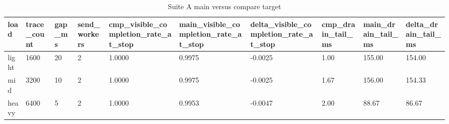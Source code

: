 \begin{table}[htbp]
\centering
\caption{Suite A main versus compare target}
\begin{tabular}{llllllllll}
\hline
load & trace\_count & gap\_ms & send\_workers & cmp\_visible\_completion\_rate\_at\_stop & main\_visible\_completion\_rate\_at\_stop & delta\_visible\_completion\_rate\_at\_stop & cmp\_drain\_tail\_ms & main\_drain\_tail\_ms & delta\_drain\_tail\_ms \\
\hline
light & 1600 & 20 & 2 & 1.0000 & 0.9975 & -0.0025 & 1.00 & 155.00 & 154.00 \\
mid & 3200 & 10 & 2 & 1.0000 & 0.9975 & -0.0025 & 1.67 & 156.00 & 154.33 \\
heavy & 6400 & 5 & 2 & 1.0000 & 0.9953 & -0.0047 & 2.00 & 88.67 & 86.67 \\
\hline
\end{tabular}
\end{table}
